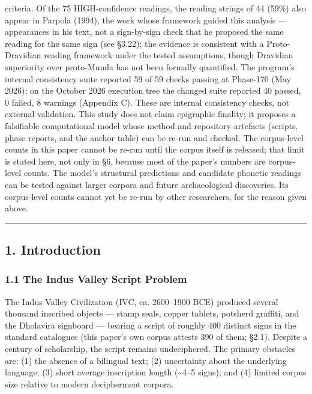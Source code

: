 \documentclass[
]{article}
\begin{document}
criteria. Of the 75 HIGH-confidence readings, the reading strings of 44 (59\%) also appear in Parpola (1994), the work whose framework guided this analysis --- appearances in his text, not a sign-by-sign check that he proposed the same reading for the same sign (see §3.22); the
evidence is consistent with a Proto-Dravidian reading framework under the
tested assumptions, though Dravidian superiority over proto-Munda has not
been formally quantified. The program's internal consistency suite reported 59 of 59 checks passing at Phase-170 (May 2026); on the October 2026 execution tree the changed suite reported 40 passed, 0 failed, 8 warnings (Appendix C). These are internal consistency checks, not external validation. This study does not claim epigraphic finality; it proposes a falsifiable computational model whose method and repository artefacts (scripts, phase reports, and the anchor table) can be re-run and checked. The corpus-level counts in this paper cannot be re-run until the corpus itself is released; that limit is stated here, not only in §6, because most of the paper's numbers are corpus-level counts. The model's structural predictions and candidate phonetic readings can be tested against larger corpora and future archaeological discoveries. Its corpus-level counts cannot yet be re-run by other researchers, for the reason given above.


\begin{center}\rule{0.5\linewidth}{0.5pt}\end{center}

\subsection{1. Introduction}\label{introduction}

\subsubsection{1.1 The Indus Valley Script
Problem}\label{the-indus-valley-script-problem}

The Indus Valley Civilization (IVC, ca. 2600--1900 BCE) produced several thousand inscribed objects --- stamp seals, copper tablets, potsherd graffiti, and the Dholavira signboard --- bearing a script of roughly 400 distinct signs in the standard catalogues (this paper's own corpus attests 390 of them; §2.1). Despite a century of scholarship, the script remains undeciphered. The primary obstacles are: (1)
the absence of a bilingual text; (2) uncertainty about the underlying
language; (3) short average inscription length (\textasciitilde4--5
signs); and (4) limited corpus size relative to modern decipherment
corpora.
\end{document}
